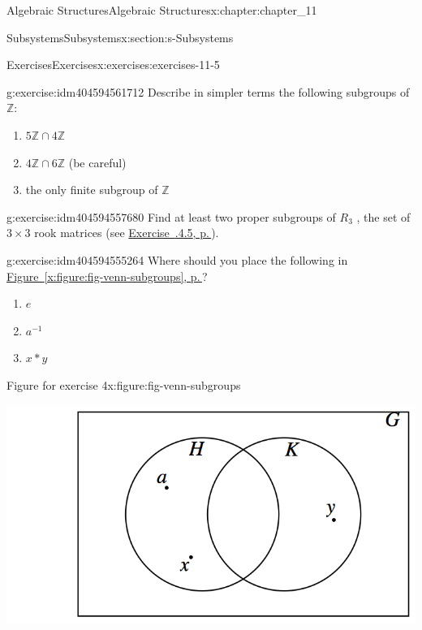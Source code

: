 \documentclass[twoside,10pt,]{book}
\newcommand{\xreffont}{\relax}
\numberwithin{equation}{section}
\begin{document}
\begin{chapterptx}{Algebraic Structures}{}{Algebraic Structures}{}{}{x:chapter:chapter_11}
\begin{sectionptx}{Subsystems}{}{Subsystems}{}{}{x:section:s-Subsystems}
\begin{exercises-subsection}{Exercises}{}{Exercises}{}{}{x:exercises:exercises-11-5}
\begin{divisionexercise}{2}{}{}{g:exercise:idm404594561712}%
Describe in simpler terms the following subgroups of \(\mathbb{Z}\):%
\begin{enumerate}[label=(\alph*)]
\item{}\(5\mathbb{Z} \cap  4\mathbb{Z}\)%
\item{}\(4\mathbb{Z} \cap  6\mathbb{Z}\) (be careful)%
\item{}the only finite subgroup of \(\mathbb{Z}\)%
\end{enumerate}
%
\end{divisionexercise}%
\begin{divisionexercise}{3}{}{}{g:exercise:idm404594557680}%
Find at least two proper subgroups of \(R_3\) , the set of \(3\times 3\) rook matrices (see \hyperlink{x:exercise:ex-rook-matrices}{Exercise~{\xreffont 11.2.4.5}, p.\,\pageref{x:exercise:ex-rook-matrices}}).%
\end{divisionexercise}%
\begin{divisionexercise}{4}{}{}{g:exercise:idm404594555264}%
Where should you place the following in \hyperref[x:figure:fig-venn-subgroups]{Figure~{\xreffont\ref{x:figure:fig-venn-subgroups}}, p.\,\pageref{x:figure:fig-venn-subgroups}}?%
\begin{enumerate}[label=(\alph*)]
\item{}\(e\)%
\item{}\(a^{-1}\)%
\item{}\(x * y\)%
\end{enumerate}
%
\begin{figureptx}{Figure for exercise 4}{x:figure:fig-venn-subgroups}{}%
\begin{image}{0.165}{0.67}{0.165}%
\includegraphics[width=\linewidth]{images/fig-venn-subgroups.png}
\end{image}%
\tcblower
\end{figureptx}%

\end{divisionexercise}
\end{exercises-subsection}
\end{sectionptx}
\end{chapterptx}
\end{document}
